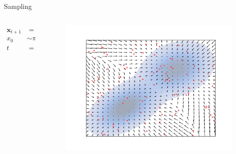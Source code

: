 \documentclass[handout, aspectratio=169,xcolor=dvipsnames]{beamer}
\newcommand{\bx}{\mathbf{x}}
\begin{document}
\begin{frame}{Sampling}
  \begin{columns}
    \begin{column}{0.5\textwidth}
      \begin{align*}
        \bx_{t+1} &= \bx_{t} + \alpha \cdot s_\theta(\bx_t) \\
        x_0 &\sim \pi_{\text{init}}\\
        t &= 0, 1, \dots T \to \infty
      \end{align*}
    \end{column}
    \begin{column}{0.5\textwidth}
      \centering
      \begin{figure}
        \centering
        \includegraphics[width=\textwidth]{figs/gen/gaussian_mixture_score_init.png}
      \end{figure}
    \end{column}
  \end{columns}
\end{frame}
\end{document}
